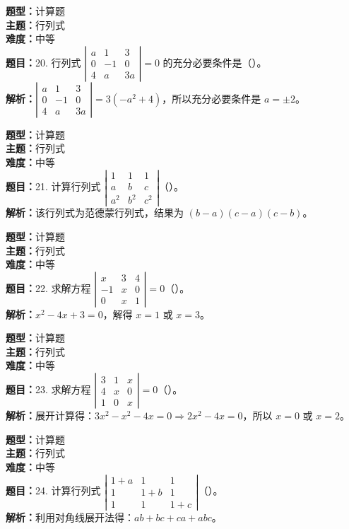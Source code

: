 \documentclass{ctexart}
\newenvironment{question}[5]{%
	\noindent\textbf{题型：}#1\\
	\textbf{主题：}#2\\
	\textbf{难度：}#3\\
	\textbf{题目：}#4\\
	\textbf{解析：}#5\\
	\vspace{1em}
}{}
\begin{document}
\begin{question} 
	{计算题} 
	{行列式}
	{中等}
	{20. 行列式 $\left|\begin{array}{ccc}a & 1 & 3 \\ 0 & -1 & 0 \\ 4 & a & 3a\end{array}\right|=0$ 的充分必要条件是（）。}
	{$\left|\begin{array}{ccc}a & 1 & 3 \\ 0 & -1 & 0 \\ 4 & a & 3a\end{array}\right| = 3(-a^2 + 4)$，所以充分必要条件是 $a = \pm2$。}
\end{question}

\begin{question} 
	{计算题} 
	{行列式}
	{中等}
	{21. 计算行列式 $\left|\begin{array}{ccc}1 & 1 & 1 \\ a & b & c \\ a^2 & b^2 & c^2\end{array}\right|$（）。}
	{该行列式为范德蒙行列式，结果为 $(b - a)(c - a)(c - b)$。}
\end{question}

\begin{question} 
	{计算题} 
	{行列式}
	{中等}
	{22. 求解方程 $\left|\begin{array}{ccc}x & 3 & 4 \\ -1 & x & 0 \\ 0 & x & 1\end{array}\right| = 0$（）。}
	{$x^2 - 4x + 3 = 0$，解得 $x = 1$ 或 $x = 3$。}
\end{question}

\begin{question} 
	{计算题} 
	{行列式}
	{中等}
	{23. 求解方程 $\left|\begin{array}{ccc}3 & 1 & x \\ 4 & x & 0 \\ 1 & 0 & x\end{array}\right|=0$（）。}
	{展开计算得：$3x^2 - x^2 - 4x = 0 \Rightarrow 2x^2 - 4x = 0$，所以 $x = 0$ 或 $x = 2$。}
\end{question}

\begin{question} 
	{计算题} 
	{行列式}
	{中等}
	{24. 计算行列式 $\left|\begin{array}{ccc}1+a & 1 & 1 \\ 1 & 1+b & 1 \\ 1 & 1 & 1+c\end{array}\right|$（）。}
	{利用对角线展开法得：$ab + bc + ca + abc$。}
\end{question}
\end{document}
